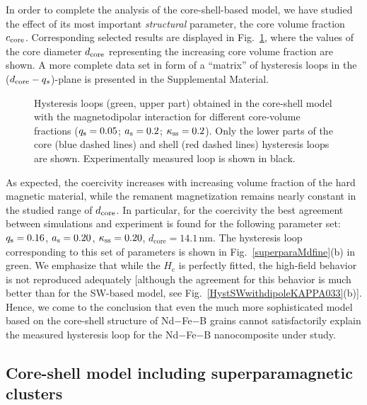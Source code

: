 \documentclass[prm,twocolumn,showkeys,preprintnumbers,amsmath,amssymb,superscriptaddress,aps,10pt]{revtex4-1}
\begin{document}
In order to complete the analysis of the core-shell-based model, we have studied the effect of its most important \textit{structural} parameter, the core volume fraction $c_{\rm core}$. Corresponding selected results are displayed in Fig.~\ref{cs_ccore_qs}, where the values of the core diameter $d_{\rm core}$ representing the increasing core volume fraction are shown. A more complete data set in form of a ``matrix'' of hysteresis loops in the ($d_{\rm core} - q_s$)-plane is presented in the Supplemental Material.
\begin{figure}[htb]
\centering
{}
\caption{Hysteresis loops (green, upper part) obtained in the core-shell model with the magnetodipolar interaction for different core-volume fractions ($q_{\rm s} = 0.05$; $a_{\rm s} = 0.2$; $\kappa_{\rm ss} = 0.2$). Only the lower parts of the core (blue dashed lines) and shell (red dashed lines) hysteresis loops are shown. Experimentally measured loop is shown in black.}
\label{cs_ccore_qs}
\end{figure}
As expected, the coercivity increases with increasing volume fraction of the hard magnetic material, while the remanent magnetization remains nearly constant in the studied range of $d_{\rm core}$. In particular, for the coercivity the best agreement between simulations and experiment is found for the following parameter set: $q_{\rm s} = 0.16$, $a_{\rm s} = 0.20$, $\kappa_{\rm ss} = 0.20$, $d_{\mathrm{core}} = 14.1 \, \mathrm{nm}$. The hysteresis loop corresponding to this set of parameters is shown in Fig.~\ref{superparaMdfine}(b) in green. We emphasize that while the $H_{\mathrm{c}}$ is perfectly fitted, the high-field behavior is not reproduced adequately [although the agreement for this behavior is much better than for the SW-based model, see Fig.~\ref{HystSWwithdipoleKAPPA033}(b)]. Hence, we come to the conclusion that even the much more sophisticated model based on the core-shell structure of Nd$-$Fe$-$B grains cannot satisfactorily explain the measured hysteresis loop for the Nd$-$Fe$-$B nanocomposite under study.

\subsection{Core-shell model including superparamagnetic clusters}
\end{document}
